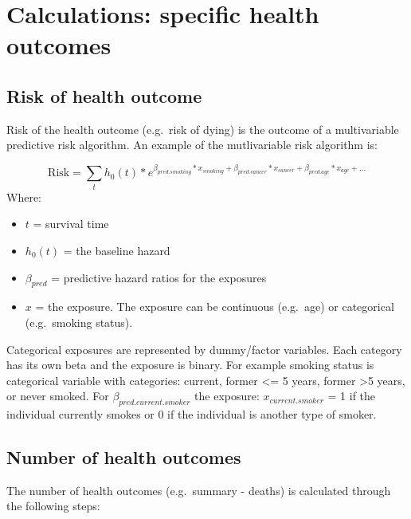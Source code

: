 \documentclass[]{book}
\providecommand{\tightlist}{%
  \setlength{\itemsep}{0pt}\setlength{\parskip}{0pt}}
\begin{document}
\hypertarget{calculations-specific-health-outcomes}{%
\section{Calculations: specific health outcomes}\label{calculations-specific-health-outcomes}}

\hypertarget{risk-of-health-outcome}{%
\subsection{Risk of health outcome}\label{risk-of-health-outcome}}

Risk of the health outcome (e.g.~risk of dying) is the outcome of a multivariable predictive risk algorithm. An example of the mutlivariable risk algorithm is:

\[ \text{Risk} = \sum_t h_0(t) * e^{\beta_{pred.smoking}*x_{smoking}+\beta_{pred.cancer}*x_{cancer} + \beta_{pred.age}*x_{age} +...}  \]
Where:

\begin{itemize}
\tightlist
\item
  \(t\) = survival time
\item
  \(h_0(t)\) = the baseline hazard
\item
  \(\beta_{pred}\) = predictive hazard ratios for the exposures
\item
  \(x\) = the exposure. The exposure can be continuous (e.g.~age) or categorical (e.g.~smoking status).
\end{itemize}

Categorical exposures are represented by dummy/factor variables. Each category has its own beta and the exposure is binary. For example smoking status is categorical variable with categories: current, former \textless{}= 5 years, former \textgreater{}5 years, or never smoked. For \(\beta_{pred.current.smoker}\) the exposure: \(x_{current.smoker}\) = 1 if the individual currently smokes or 0 if the individual is another type of smoker.

\hypertarget{number-of-health-outcomes}{%
\subsection{Number of health outcomes}\label{number-of-health-outcomes}}

The number of health outcomes (e.g.~summary - deaths) is calculated through the following steps:
\end{document}
